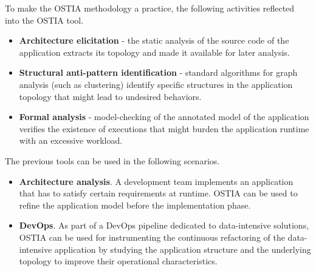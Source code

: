 \documentclass[smallextended]{svjour3}       %
\begin{document}
{To make the OSTIA methodology a practice, the following activities reflected into the OSTIA tool.
\begin{itemize}
	\item \textbf{Architecture elicitation} - the static analysis of the source code of the application extracts its topology and made it available for later analysis.
	\item \textbf{Structural anti-pattern identification} - standard algorithms for graph analysis (such as clustering) identify specific structures in the application topology that might lead to undesired behaviors.
	\item \textbf{Formal analysis} - model-checking of the annotated model of the application verifies the existence of executions that might burden the application runtime with an excessive workload.
\end{itemize}

\noindent
The previous tools can be used in the following scenarios.
\begin{itemize}
	\item \textbf{Architecture analysis}. A development team implements an application that has to satisfy certain requirements at runtime. OSTIA can be used to refine the application model before the implementation phase.
	\item \textbf{DevOps}. As part of a DevOps pipeline dedicated to data-intensive solutions, OSTIA can be used for instrumenting the continuous refactoring of the data-intensive application by studying the application structure and the underlying topology to improve their operational characteristics.
\end{itemize}
}


\end{document}
